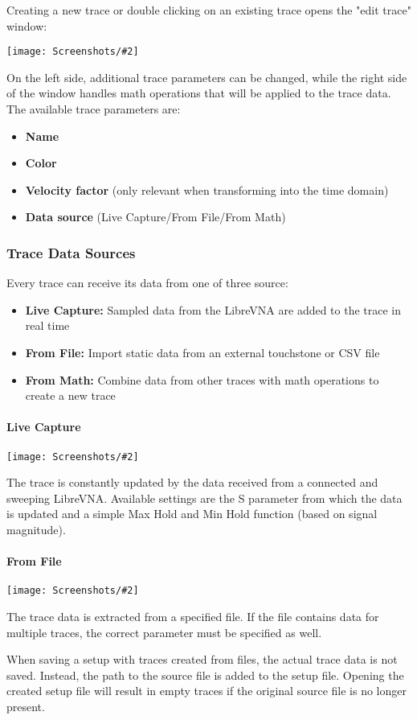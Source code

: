 \documentclass[a4paper,11pt]{article}
\newcommand\danger[1][5ex]{%
  \renewcommand\stacktype{L}%
  \scaleto{\stackon[1.3pt]{\color{red}$\triangle$}{\tiny !}}{#1}%
}
\newenvironment{important}[1][]{%
   \begin{mdframed}[%
      backgroundcolor={red!15}, hidealllines=true,
      skipabove=0.7\baselineskip, skipbelow=0.7\baselineskip,
      splitbottomskip=2pt, splittopskip=4pt, #1]%
   \makebox[0pt]{%
      \smash{%
         \hspace*{-45pt}%
         \raisebox{-5pt}{%
            {\danger}%
         }%
      }%
   }%
}{\end{mdframed}}
\newcommand{\screenshot}[2]{\begin{center}
\texttt{[image: Screenshots/\#2]}
\end{center}}
\begin{document}
Creating a new trace or double clicking on an existing trace opens the "edit trace" window:
\screenshot{1.0}{TraceEdit.png}
On the left side, additional trace parameters can be changed, while the right side of the window handles math operations that will be applied to the trace data. The available trace parameters are:
\begin{itemize}
\item \textbf{Name}
\item \textbf{Color}
\item \textbf{Velocity factor} (only relevant when transforming into the time domain)
\item \textbf{Data source} (Live Capture/From File/From Math)
\end{itemize}

\subsubsection{Trace Data Sources}
Every trace can receive its data from one of three source:
\begin{itemize}
\item \textbf{Live Capture:} Sampled data from the LibreVNA are added to the trace in real time
\item \textbf{From File:} Import static data from an external touchstone or CSV file
\item \textbf{From Math:} Combine data from other traces with math operations to create a new trace
\end{itemize}

\paragraph{Live Capture}
\screenshot{0.5}{LiveCapture.png}
The trace is constantly updated by the data received from a connected and sweeping LibreVNA. Available settings are the S parameter from which the data is updated and a simple Max Hold and Min Hold function (based on signal magnitude).

\paragraph{From File}
\screenshot{0.5}{FromFile.png}
The trace data is extracted from a specified file. If the file contains data for multiple traces, the correct parameter must be specified as well.
\begin{important}
When saving a setup with traces created from files, the actual trace data is not saved. Instead, the path to the source file is added to the setup file. Opening the created setup file will result in empty traces if the original source file is no longer present.
\end{important}
\end{document}
